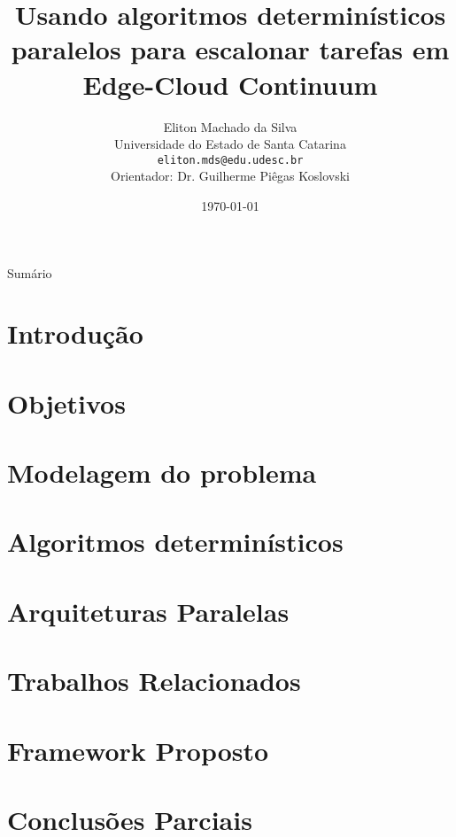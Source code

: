\documentclass[xcolor=table]{beamer}
\title[]{Usando algoritmos determinísticos paralelos para escalonar tarefas em Edge-Cloud Continuum}
\author[Eliton Machado da Silva]{
    Eliton Machado da Silva\\\smallskip
    {\scriptsize Universidade do Estado de Santa Catarina \\\smallskip
    \vspace{-2mm}
    \texttt{eliton.mds@edu.udesc.br}\\\medskip
    {Orientador: Dr. Guilherme Piêgas Koslovski}\\
    }
}
\date{\today}
\begin{document}
    \begin{frame}
        \titlepage
    \end{frame}

    \begin{frame}[allowframebreaks]{Sumário}
        \tableofcontents
    \end{frame}

    \section[]{Introdução}
    
    

    \section[]{Objetivos}
    

    \section[]{Modelagem do problema}
    

    \section[]{Algoritmos determinísticos}
    

    \section[]{Arquiteturas Paralelas}
    

    \section[]{Trabalhos Relacionados}
    

    \section[]{Framework Proposto}
    
    

    \section[]{Conclusões Parciais}
    
    

\end{document}
